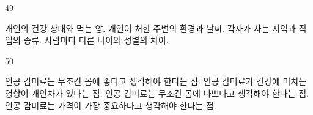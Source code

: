 \documentclass[fs9,seriesFre]{korfarm-base}
\begin{document}
\begin{kfSentenceUnit}{49}{}
\begin{kfChoices}
\kfChoice 개인의 건강 상태와 먹는 양.
\kfChoice 개인이 처한 주변의 환경과 날씨.
\kfChoice 각자가 사는 지역과 직업의 종류.
\kfChoice 사람마다 다른 나이와 성별의 차이.
\end{kfChoices}
\end{kfSentenceUnit}

\begin{kfSentenceUnit}{50}{}
\begin{kfChoices}
\kfChoice 인공 감미료는 무조건 몸에 좋다고 생각해야 한다는 점.
\kfChoice 인공 감미료가 건강에 미치는 영향이 개인차가 있다는 점.
\kfChoice 인공 감미료는 무조건 몸에 나쁘다고 생각해야 한다는 점.
\kfChoice 인공 감미료는 가격이 가장 중요하다고 생각해야 한다는 점.
\end{kfChoices}
\end{kfSentenceUnit}

\kfEndMC

\end{document}

